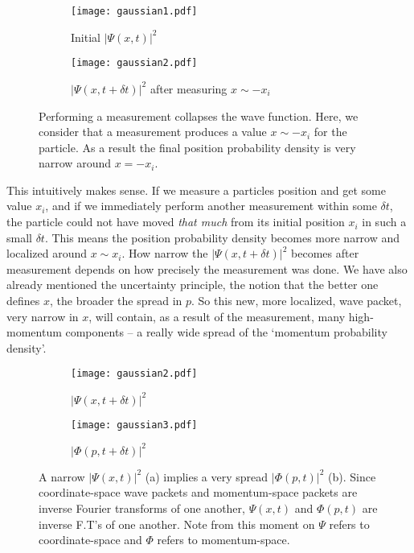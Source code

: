\begin{figure}[htp]
\begin{subfigure}[b]{.49\linewidth}
\centering
\texttt{[image: gaussian1.pdf]}\label{fig_1a}
\caption{Initial $|\Psi(x, t)|^2$}
\end{subfigure}
\begin{subfigure}[b]{.49\linewidth}
\centering
\texttt{[image: gaussian2.pdf]}\label{fig_1b}
\caption{$|\Psi(x, t + \delta t)|^2$ after measuring $x \sim -x_i$}
\end{subfigure}%
\caption{Performing a measurement collapses the wave function. Here, we
consider that a measurement produces a value $x \sim -x_i$ for the particle. As
a result the final position probability density is very narrow around $x = -x_i$.}
\end{figure} 

This intuitively makes sense. If we measure a particles position and get some
value $x_i$, and if we immediately perform another measurement within some  $\delta t$,
the particle could not have moved \textit{that much} from its initial position
$x_i$ in such a small $\delta t$. This means the position probability  density
becomes more narrow and localized around $x \sim x_i$. How narrow the $|\Psi(x, t+\delta t)|^2$
becomes after measurement depends on how precisely the measurement was done. We have also already mentioned the uncertainty principle, the notion that the
better one defines $x$, the broader the spread in $p$. So this new, more
localized, wave packet, very narrow in $x$, will contain, as a result of the
measurement, many high-momentum components -- a really wide spread of the
`momentum probability density'. 

\begin{figure}[H]
\begin{subfigure}[b]{.49\linewidth}
\centering
\texttt{[image: gaussian2.pdf]}\label{fig_1c}
\caption{$|\Psi(x, t + \delta t)|^2$ }
\end{subfigure}
\begin{subfigure}[b]{.49\linewidth}
\centering
\texttt{[image: gaussian3.pdf]}\label{fig_1d}
\caption{ $|\Phi(p, t + \delta t)|^2$}
\end{subfigure}%
\caption{A narrow $|\Psi(x, t)|^2$  (a) implies a very spread $|\Phi(p, t)|^2$ (b). Since coordinate-space wave packets and momentum-space packets are
inverse Fourier transforms of one another, $\Psi(x, t)$ and $\Phi(p, t)$ are inverse F.T's
of one another. Note from this moment on $\Psi$ refers to coordinate-space and
$\Phi$ refers to momentum-space.}
\end{figure}

